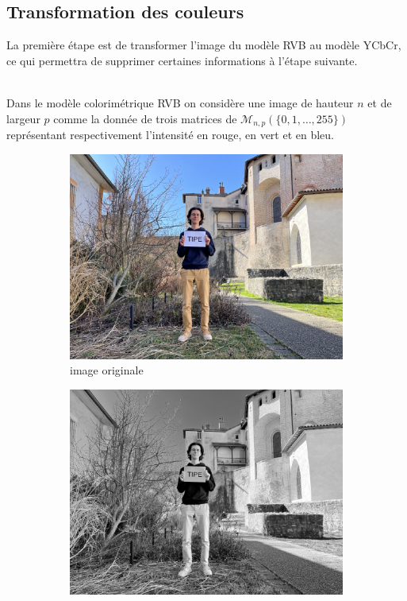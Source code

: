 \documentclass{article}
\begin{document}
\subsection{Transformation des couleurs}

La première étape est de transformer l'image du modèle RVB au modèle YCbCr, ce qui permettra de supprimer certaines informations à l'étape suivante.
\\ \ 

Dans le modèle colorimétrique RVB on considère une image de hauteur $n$ et de largeur $p$ comme la donnée de trois matrices de $ \mathcal{M}_{n,p}(\{0, 1, \ldots, 255\}) $ représentant respectivement l'intensité en rouge, en vert et en bleu.

\begin{figure}[htbp]
    \centering
    \begin{subfigure}[b]{0.24\textwidth}
        \includegraphics[width=\textwidth]{transformation_couleur/principale_1000_750_smooth.png}
        \caption{image originale}
    \end{subfigure}
    \hfill
    \begin{subfigure}[b]{0.24\textwidth}
        \includegraphics[width=\textwidth]{transformation_couleur/rouge.png}

\end{subfigure}
\end{figure}
\end{document}
